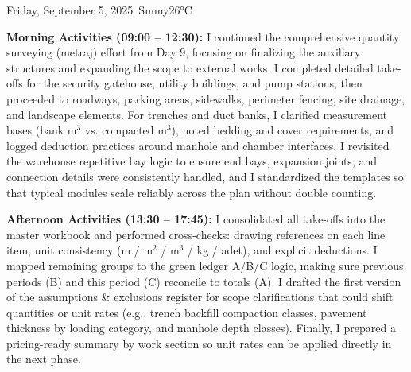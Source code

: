 \begin{dailyentry}{Friday, September 5, 2025}{\weathersunny\ Sunny}{26°C}

\begin{workcontent}
\textbf{Morning Activities (09:00 – 12:30):} I continued the comprehensive quantity surveying (metraj) effort from Day 9, focusing on finalizing the auxiliary structures and expanding the scope to external works. I completed detailed take-offs for the security gatehouse, utility buildings, and pump stations, then proceeded to roadways, parking areas, sidewalks, perimeter fencing, site drainage, and landscape elements. For trenches and duct banks, I clarified measurement bases (bank m$^{3}$ vs. compacted m$^{3}$), noted bedding and cover requirements, and logged deduction practices around manhole and chamber interfaces. I revisited the warehouse repetitive bay logic to ensure end bays, expansion joints, and connection details were consistently handled, and I standardized the templates so that typical modules scale reliably across the plan without double counting.

\textbf{Afternoon Activities (13:30 – 17:45):} I consolidated all take-offs into the master workbook and performed cross-checks: drawing references on each line item, unit consistency (m / m$^{2}$ / m$^{3}$ / kg / adet), and explicit deductions. I mapped remaining groups to the green ledger A/B/C logic, making sure previous periods (B) and this period (C) reconcile to totals (A). I drafted the first version of the assumptions \& exclusions register for scope clarifications that could shift quantities or unit rates (e.g., trench backfill compaction classes, pavement thickness by loading category, and manhole depth classes). Finally, I prepared a pricing-ready summary by work section so unit rates can be applied directly in the next phase.

\begin{center}
\end{center}


\end{workcontent}
\end{dailyentry}
